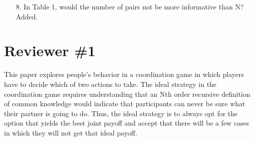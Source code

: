 \documentclass[a4paper]{article}
\newenvironment{response}{\smallskip \noindent \color{blue}}{\color{black}\smallskip}
\newenvironment{tobo}{\smallskip \noindent \color{yellow!80!black!80}}{\color{black}\smallskip}
\begin{document}
\begin{enumerate}
  \item[8.]    In Table 1, would the number of pairs not be more informative than N? \begin{response}Added. \end{response}
\end{enumerate}  


\section*{Reviewer \#1}
This paper explores people's behavior in a coordination game in which players have to decide which of two actions to take. The ideal strategy in the coordination game requires understanding that an Nth order recursive definition of common knowledge would indicate that participants can never be sure what their partner is going to do. Thus, the ideal strategy is to always opt for the option that yields the best joint payoff and accept that there will be a few cases in which they will not get that ideal payoff. 
\end{document}
